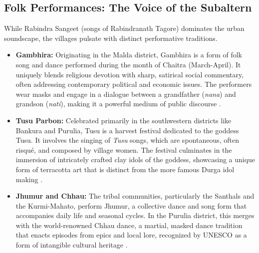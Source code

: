 \documentclass{article}
\begin{document}
\subsection{Folk Performances: The Voice of the Subaltern}
While Rabindra Sangeet (songs of Rabindranath Tagore) dominates the urban soundscape, the villages pulsate with distinct performative traditions.
\begin{itemize}
    \item \textbf{Gambhira:} Originating in the Malda district, Gambhira is a form of folk song and dance performed during the month of Chaitra (March-April). It uniquely blends religious devotion with sharp, satirical social commentary, often addressing contemporary political and economic issues. The performers wear masks and engage in a dialogue between a grandfather (\textit{nana}) and grandson (\textit{nati}), making it a powerful medium of public discourse \cite{chatterjee2009}.
    \item \textbf{Tusu Parbon:} Celebrated primarily in the southwestern districts like Bankura and Purulia, Tusu is a harvest festival dedicated to the goddess Tusu. It involves the singing of \textit{Tusu} songs, which are spontaneous, often risqué, and composed by village women. The festival culminates in the immersion of intricately crafted clay idols of the goddess, showcasing a unique form of terracotta art that is distinct from the more famous Durga idol making \cite{ray2015}.
    \item \textbf{Jhumur and Chhau:} The tribal communities, particularly the Santhals and the Kurmi-Mahato, perform Jhumur, a collective dance and song form that accompanies daily life and seasonal cycles. In the Purulia district, this merges with the world-renowned Chhau dance, a martial, masked dance tradition that enacts episodes from epics and local lore, recognized by UNESCO as a form of intangible cultural heritage \cite{unesco2010}.
\end{itemize}
\end{document}

